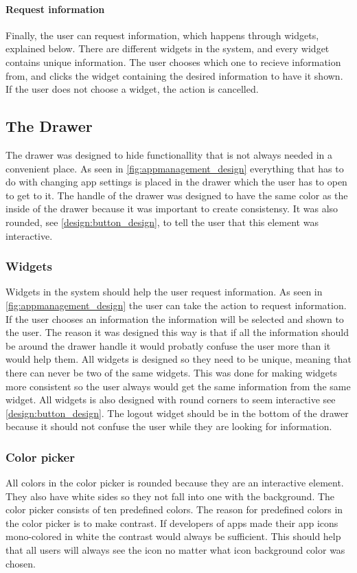 \paragraph{Request information} Finally, the user can request information, which happens through widgets, explained below. 
There are different widgets in the system, and every widget contains unique information.
The user chooses which one to recieve information from, and clicks the widget containing the desired information to have it shown. 
If the user does not choose a widget, the action is cancelled. 

\subsection{The Drawer}
\label{sec:drawer}
The drawer was designed to hide functionallity that is not always needed in a convenient place. As seen in \autoref{fig:appmanagement_design} everything that has to do with changing app settings is placed in the drawer which the user has to open to get to it.
The handle of the drawer was designed to have the same color as the inside of the drawer because it was important to create consistensy. 
It was also rounded, see \autoref{design:button_design}, to tell the user that this element was interactive.

\subsubsection{Widgets}
\label{par:widgets}
Widgets in the \giraf[] system should help the user request information. As seen in \autoref{fig:appmanagement_design} the user can take the action to request information. If the user chooses an information the information will be selected and shown to the user.
The reason it was designed this way is that if all the information should be around the drawer handle it would probatly confuse the user more than it would help them.
All widgets is designed so they need to be unique, meaning that there can never be two of the same widgets. This was done for making widgets more consistent so the user always would get the same information from the same widget. All widgets is also designed with round corners to seem interactive see \autoref{design:button_design}.
The logout widget should be in the bottom of the drawer because it should not confuse the user while they are looking for information.

\subsubsection{Color picker}
\label{par:colorpicker}
All colors in the color picker is rounded because they are an interactive element. They also have white sides so they not fall into one with the background. The color picker consists of ten predefined colors. The reason for predefined colors in the color picker is to make contrast. If developers of \giraf[] apps made their app icons mono-colored in white the contrast would always be sufficient. This should help that all users will always see the icon no matter what icon background color was chosen.
